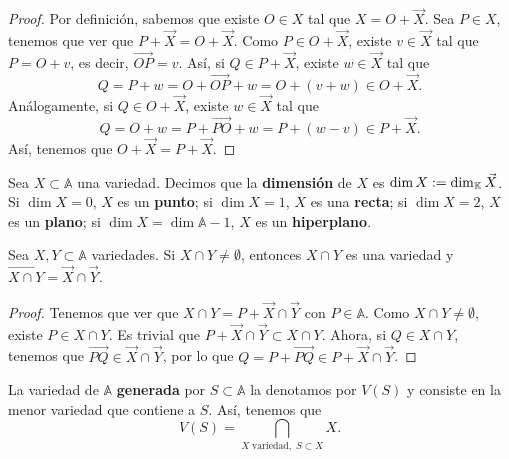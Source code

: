 \begin{proof}
Por definición, sabemos que existe $\displaystyle O \in X $ tal que $\displaystyle X = O + \vec{X} $. Sea $\displaystyle P \in X $, tenemos que ver que $\displaystyle P + \vec{X} = O + \vec{X} $. Como $\displaystyle P \in O + \vec{X} $, existe $\displaystyle v \in \vec{X} $ tal que $\displaystyle P = O + v $, es decir, $\displaystyle \overrightarrow{OP} = v $. Así, si $\displaystyle Q \in P + \vec{X} $, existe $\displaystyle w \in \vec{X} $ tal que 
\[Q = P + w = O + \overrightarrow{OP} + w = O + \left(v + w\right) \in O + \vec{X} .\]
Análogamente, si $\displaystyle Q \in O + \vec{X} $, existe $\displaystyle w \in \vec{X} $ tal que 
\[Q = O + w = P + \overrightarrow{PO} + w = P + \left(w -v\right) \in P + \vec{X} .\]
Así, tenemos que $\displaystyle O+\vec{X} = P + \vec{X} $.
\end{proof}
\begin{definition}
Sea $\displaystyle X \subset \mathbb{A} $ una variedad. Decimos que la \textbf{dimensión} de $\displaystyle X $ es $\displaystyle \dim X := \dim_{\mathbb{K}}\vec{X} $. Si $\displaystyle \dim X = 0 $, $\displaystyle X $ es un \textbf{punto}; si $\displaystyle \dim X = 1 $, $\displaystyle X $ es una \textbf{recta}; si $\displaystyle \dim X = 2 $, $\displaystyle X $ es un \textbf{plano}; si $\displaystyle \dim X = \dim \mathbb{A} -1 $, $\displaystyle X $ es un \textbf{hiperplano}.
\end{definition}
\begin{lema}
Sea $\displaystyle X,Y \subset \mathbb{A} $ variedades. Si $\displaystyle X \cap Y \neq \emptyset $, entonces $\displaystyle X \cap Y  $ es una variedad y $\displaystyle \overrightarrow{X \cap Y} = \vec{X} \cap \vec{Y} $. 
\end{lema}
\begin{proof}
Tenemos que ver que $\displaystyle X \cap Y = P + \vec{X} \cap \vec{Y} $ con $\displaystyle P \in \mathbb{A} $. Como $\displaystyle X \cap Y \neq \emptyset $, existe $\displaystyle P \in X \cap Y $. Es trivial que $\displaystyle P + \vec{X} \cap \vec{Y} \subset X \cap Y $. Ahora, si $\displaystyle Q \in X \cap Y $, tenemos que $\displaystyle \overrightarrow{PQ} \in \vec{X} \cap \vec{Y} $, por lo que $\displaystyle Q = P + \overrightarrow{PQ} \in P + \vec{X} \cap \vec{Y} $. 
\end{proof}
\begin{definition}
La variedad de $\displaystyle \mathbb{A} $ \textbf{generada} por $\displaystyle S \subset \mathbb{A} $ la denotamos por $\displaystyle V\left(S\right) $ y consiste en la menor variedad que contiene a $\displaystyle S $. Así, tenemos que 
\[V\left(S\right) = \bigcap_{ X \; \text{variedad}, \; S \subset X}X .\]
\end{definition}
